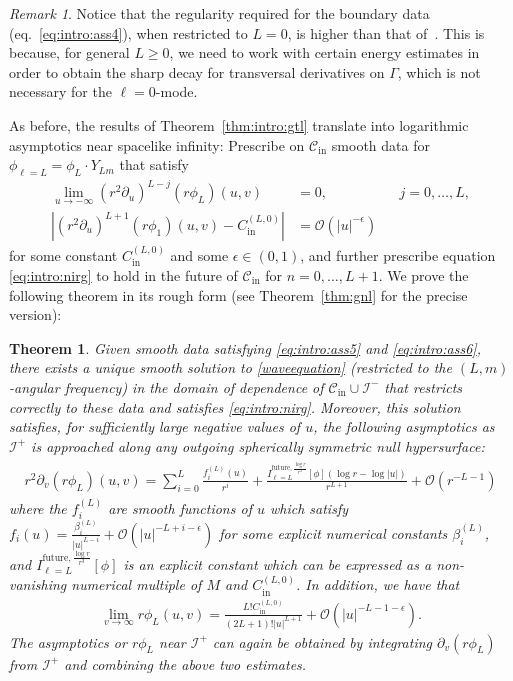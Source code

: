 \documentclass[11pt,english]{article}
\numberwithin{equation}{section}
\newtheorem{thm}{Theorem}[section]
\theoremstyle{remark}
\newtheorem{rem}{Remark}[section]
\theoremstyle{plain}
\theoremstyle{remark}
\newcommand{\pu}{\partial_u}
\newcommand{\pv}{\partial_v}
\renewcommand{\(}{\left(}
\renewcommand{\)}{\right)}
\newcommand{\ILlog}[1]{I_{\ell=#1}^{\mathrm{future},\frac{\log r}{r^3}}}
\begin{document}
\begin{rem}
Notice that the regularity required for the boundary data (eq.\ \eqref{eq:intro:ass4}), when restricted to $L=0$, is higher than that of~\cite{I}. This is because, for general $L\geq 0$, we need to work with certain energy estimates in order to obtain the sharp decay for transversal derivatives on $\Gamma$, which is not necessary for the $\ell=0$-mode.
\end{rem}
As before, the results of Theorem~\ref{thm:intro:gtl} translate into logarithmic asymptotics near spacelike infinity:
 Prescribe on $\mathcal{C}_{\mathrm{in}}$ smooth data for $\phi_{\ell=L}=\phi_L \cdot Y_{Lm}$ that satisfy
\begin{align}\label{eq:intro:ass5}
\lim_{u\to-\infty}(r^2\pu)^{L-j}(r\phi_L)(u,v)&=0,&&j=0,\dots,L,\\
\left|(r^2\pu)^{L+1}(r\phi_1)(u,v) - C^{(L,0)}_{\mathrm{in}}\right|&=\mathcal{O}(|u|^{-\epsilon})&&\label{eq:intro:ass6}
\end{align}
for some constant $C^{(L,0)}_{\mathrm{in}}$ and some $\epsilon\in(0,1)$,
and further prescribe equation \eqref{eq:intro:nirg} to hold in the future of $\mathcal C_{\mathrm{in}}$ for $n=0,\dots,L+1$. We prove the following theorem in its rough form (see Theorem~\ref{thm:gnl} for the precise version):
	\begin{thm}\label{thm:intro:gnl}
	Given smooth data satisfying \eqref{eq:intro:ass5} and \eqref{eq:intro:ass6}, there exists a unique smooth solution to \eqref{waveequation} (restricted to the $(L,m)$-angular frequency) in the domain of dependence of $\mathcal C_{\mathrm{in}}\cup \mathcal{I}^-$ that restricts correctly to these data and satisfies \eqref{eq:intro:nirg}. 
 Moreover, this solution satisfies, for sufficiently large negative values of $u$, the following asymptotics as $\mathcal{I}^+$ is approached along any outgoing spherically symmetric null hypersurface:
	\begin{align}
	\begin{split}
	r^2\pv(r\phi_L)(u,v)=\sum_{i=0}^L \frac{f_i^{(L)}(u)}{r^{i}}+\frac{ \ILlog{L}[\phi](\log r-\log|u|)}{r^{L+1}}+\mathcal{O}(r^{-L-1})
	\end{split}
	\end{align}
	where the $f_i^{(L)}$ are smooth functions of $u$ which satisfy $f_i(u)=\frac{\beta_i^{(L)}}{|u|^{L-i}}+\mathcal{O}(|u|^{-L+i-\epsilon})$ for some explicit numerical constants $\beta_i^{(L)}$, and $\ILlog{L}[\phi]$ is an explicit constant which can be expressed as a non-vanishing numerical multiple of $M$ and $C^{(L,0)}_{\mathrm{in}}$. 
	In addition, we have that
	\begin{align}
\lim_{v\to\infty} r\phi_L(u,v)=\frac{L!C^{(L,0)}_{\mathrm{in}}}{(2L+1)!|u|^{L+1}}+\mathcal{O}(|u|^{-L-1-\epsilon}).
\end{align}
The asymptotics or $r\phi_L$ near $\mathcal I^+$ can again be obtained by integrating $\pv(r\phi_L)$ from $\mathcal I^+$ and combining the above two estimates.
	\end{thm}
\end{document}

